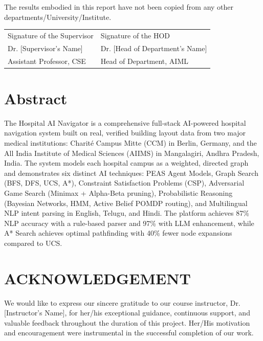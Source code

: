 \documentclass[12pt,a4paper]{report}
\begin{document}
The results embodied in this report have not been copied from any other departments/University/Institute.

\vspace{2cm}

\noindent
\begin{tabular}{@{}p{7cm}p{7cm}@{}}
Signature of the Supervisor & Signature of the HOD \\[2cm]
Dr. [Supervisor's Name] & Dr. [Head of Department's Name] \\
Assistant Professor, CSE & Head of Department, AIML \\
\end{tabular}

\newpage

\tableofcontents
\newpage

\chapter*{Abstract}

The Hospital AI Navigator is a comprehensive full-stack AI-powered hospital navigation system built on real, verified building layout data from two major medical institutions: Charit\'{e} Campus Mitte (CCM) in Berlin, Germany, and the All India Institute of Medical Sciences (AIIMS) in Mangalagiri, Andhra Pradesh, India. The system models each hospital campus as a weighted, directed graph and demonstrates six distinct AI techniques: PEAS Agent Models, Graph Search (BFS, DFS, UCS, A*), Constraint Satisfaction Problems (CSP), Adversarial Game Search (Minimax + Alpha-Beta pruning), Probabilistic Reasoning (Bayesian Networks, HMM, Active Belief POMDP routing), and Multilingual NLP intent parsing in English, Telugu, and Hindi. The platform achieves 87\% NLP accuracy with a rule-based parser and 97\% with LLM enhancement, while A* Search achieves optimal pathfinding with 40\% fewer node expansions compared to UCS.

\newpage

\chapter*{ACKNOWLEDGEMENT}

We would like to express our sincere gratitude to our course instructor, Dr. [Instructor's Name], for her/his exceptional guidance, continuous support, and valuable feedback throughout the duration of this project. Her/His motivation and encouragement were instrumental in the successful completion of our work.
\end{document}
